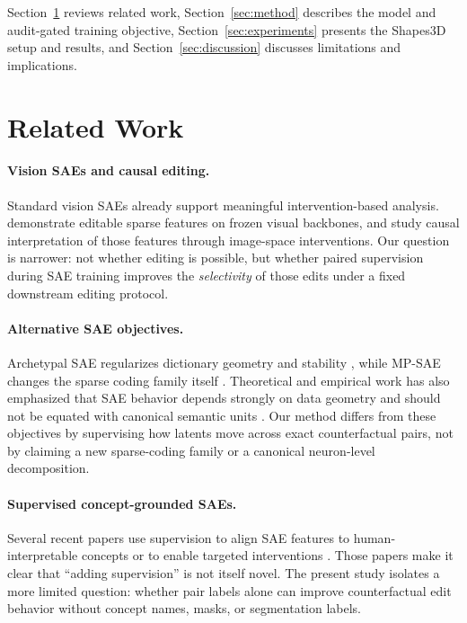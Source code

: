 Section~\ref{sec:related} reviews related work, Section~\ref{sec:method} describes the model and audit-gated training objective, Section~\ref{sec:experiments} presents the Shapes3D setup and results, and Section~\ref{sec:discussion} discusses limitations and implications.

\section{Related Work}
\label{sec:related}

\paragraph{Vision SAEs and causal editing.}
Standard vision SAEs already support meaningful intervention-based analysis. \citet{Stevens2025Interpretable} demonstrate editable sparse features on frozen visual backbones, and \citet{Han2025Causal} study causal interpretation of those features through image-space interventions. Our question is narrower: not whether editing is possible, but whether paired supervision during SAE training improves the \emph{selectivity} of those edits under a fixed downstream editing protocol.

\paragraph{Alternative SAE objectives.}
Archetypal SAE regularizes dictionary geometry and stability \citep{Fel2025Archetypal}, while MP-SAE changes the sparse coding family itself \citep{Costa2025From}. Theoretical and empirical work has also emphasized that SAE behavior depends strongly on data geometry and should not be equated with canonical semantic units \citep{Hindupur2025Projecting,Leask2025Sparse}. Our method differs from these objectives by supervising how latents move across exact counterfactual pairs, not by claiming a new sparse-coding family or a canonical neuron-level decomposition.

\paragraph{Supervised concept-grounded SAEs.}
Several recent papers use supervision to align SAE features to human-interpretable concepts or to enable targeted interventions \citep{Ding2025ConceptSAE,NasiriSarvi2025SPARC}. Those papers make it clear that ``adding supervision'' is not itself novel. The present study isolates a more limited question: whether pair labels alone can improve counterfactual edit behavior without concept names, masks, or segmentation labels.

